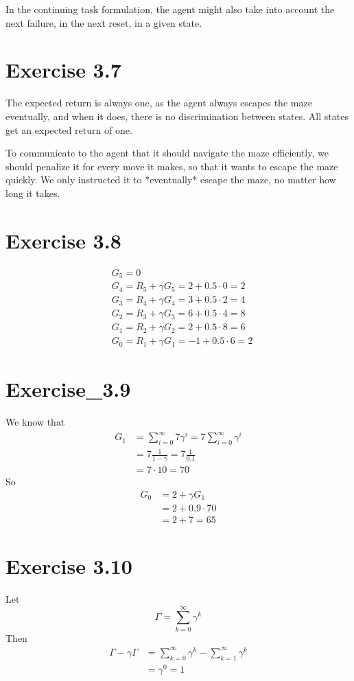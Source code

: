 \documentclass[a4paper,11pt,reqno]{amsart}
\begin{document}
In the continuing task formulation, the agent might also take into account the next failure, in the next reset, in a given state. 

\section*{Exercise 3.7}
The expected return is always one, as the agent always escapes the maze eventually, and when it does, there is no discrimination between states. All states get an expected return of one. 

To communicate to the agent that it should navigate the maze efficiently, we should penalize it for every move it makes, so that it wants to escape the maze quickly. We only instructed it to *eventually* escape the maze, no matter how long it takes. 

\section*{Exercise 3.8}
\begin{align}
    &G_5=0\\
    &G_4=R_5 + \gamma G_5 = 2 + 0.5 \cdot 0 = 2\\
    &G_3=R_4 + \gamma G_4 = 3 + 0.5 \cdot 2 = 4\\
    &G_2=R_3+\gamma G_3= 6 + 0.5 \cdot 4 = 8\\
    &G_1=R_2+\gamma G_2=2 + 0.5 \cdot 8 = 6\\
    &G_0=R_1 + \gamma G_1=-1 + 0.5 \cdot 6 = 2
\end{align}

\section*{Exercise_3.9}
We know that 
\begin{align}
    G_1 &=\sum_{i=0}^{\infty} 7\gamma ^{i}=7 \sum_{i =0}^{\infty} \gamma ^{i}\\
        &= 7 \frac{1}{1 - \gamma} = 7 \frac{1}{0.1}\\
        &= 7 \cdot 10 = 70
\end{align}
So 
\begin{align}
    G_0 &=2 + \gamma G_1\\
    &= 2 + 0.9 \cdot 70\\
    &= 2 + 7 = 65
\end{align}

\section*{Exercise 3.10}
Let
\[
    \Gamma = \sum_{k=0}^{\infty} \gamma ^{k}
\]
Then
\begin{align}
    \Gamma - \gamma \Gamma &= \sum_{k =0}^{\infty} \gamma ^{k} - \sum_{k=1}^{\infty} \gamma ^{k}\\
            &= \gamma ^{0}=1
\end{align}
\end{document}
